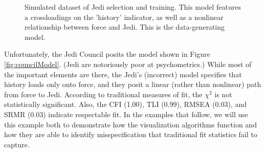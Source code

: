 \documentclass[
  english,
  doc]{apa6}
\begin{document}
\begin{figure}
\begin{center}
\caption{Simulated dataset of Jedi selection and training. This model features a crossloadings on the 'history' indicator, as well as a nonlinear relationship between force and Jedi. This is the data-generating model.}
\label{fig:force}
\end{center}
\end{figure}

Unfortunately, the Jedi Council posits the model shown in Figure \ref{fig:councilModel}. (Jedi are notoriously poor at psychometrics.) While most of the important elements are there, the Jedi's (incorrect) model specifies that history loads only onto force, and they posit a linear (rather than nonlinear) path from force to Jedi. According to traditional measures of fit, the \(\chi^2\) is not statistically significant. Also, the CFI (1.00), TLI (0.99), RMSEA (0.03), and SRMR (0.03) indicate respectable fit. In the examples that follow, we will use this example both to demonstrate how the visualization algorithms function and how they are able to identify misspecification that traditional fit statistics fail to capture.
\end{document}
